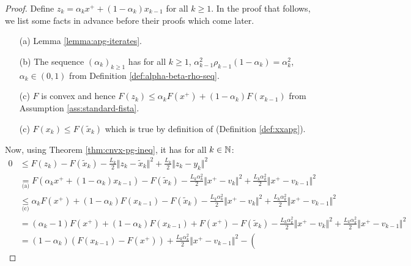 \documentclass[12pt]{report}
\begin{document}
        \begin{proof}
            Define $z_k = \alpha_k x^+ + (1 - \alpha_k)x_{k - 1}$ for all $k \ge 1$. 
            In the proof that follows, we list some facts in advance before their proofs which come later. 
            \begin{enumerate}
                \item[(a)] Lemma \ref{lemma:apg-iterates}. 
                \item[(b)] The sequence $(\alpha_k)_{k \ge 1}$ has for all $k \ge 1$, $\alpha_{k - 1}^2\rho_{k - 1}(1 - \alpha_k) = \alpha_k^2$, $\alpha_k \in (0, 1)$ from Definition \ref{def:alpha-beta-rho-seq}. 
                \item[(c)] $F$ is convex and hence $F(z_k) \le \alpha_k F(x^+) + (1 - \alpha_k)F(x_{k - 1})$ from Assumption \ref{ass:standard-fista}. 
                \item[(c)] $F(x_k) \le F(\tilde x_k)$ which is true by definition of \XXAPG{} (Definition \ref{def:xxapg}). 
            \end{enumerate}
            Now, using Theorem \ref{thm:cnvx-pg-ineq}, it has for all $k \in \mathbb N$: 
            {\allowdisplaybreaks\small
            \begin{align*}
                0 &\le 
                F(z_k) 
                - F(\tilde x_k) - \frac{L_k}{2}\Vert z_k - \tilde x_k\Vert^2 + 
                \frac{L_k}{2}\Vert z_k - y_k\Vert^2
                \\
                &\underset{\text{(a)}}{=}
                F(\alpha_k x^+ + (1 - \alpha_k)x_{k - 1}) - F(\tilde x_k)
                - \frac{L_k\alpha_k^2}{2}\Vert x^+ - v_k \Vert^2 
                + \frac{L_k\alpha_k^2}{2}\Vert x^+ - v_{k - 1}\Vert^2
                \\
                &\underset{\text{(c)}}{\le} 
                \alpha_k F(x^+) + (1 - \alpha_k) F(x_{k - 1}) - F(\tilde x_k)
                - \frac{L_k\alpha_k^2}{2}\Vert x^+ - v_k \Vert^2 
                + \frac{L_k\alpha_k^2}{2}\Vert x^+ - v_{k - 1} \Vert^2
                \\
                &= 
                (\alpha_k - 1)F(x^+) + (1 - \alpha_k) F(x_{k - 1}) + F(x^+) - F(\tilde x_k)
                - \frac{L_k\alpha_k^2}{2}\Vert x^+ - v_k \Vert^2 
                + \frac{L_k\alpha_k^2}{2}\Vert x^+ - v_{k - 1}\Vert^2
                \\
                &= 
                (1 - \alpha_k)(F(x_{k - 1}) - F(x^+)) + \frac{L_k\alpha_k^2}{2}\Vert x^+ - v_{k - 1}\Vert^2
                - \left(

\end{align*}}
\end{proof}
\end{document}
